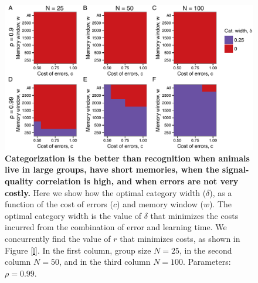 \begin{figure}
\includegraphics[width=6.85in]{figures/strategies_heat_maps.pdf}
\caption{\sffamily\small\textbf{Categorization is the better than recognition when animals live in large groups, have short memories, when the signal-quality correlation is high, and when errors are not very costly.} Here we show how the optimal category width ($\delta$), as a function of the cost of errors ($c$) and memory window ($w$). The optimal category width is the value of $\delta$ that minimizes the costs incurred from the combination of error and learning time. We concurrently find the value of $r$ that minimizes costs, as shown in Figure \ref{l}. In the first column, group size $N=25$, in the second column $N=50$, and in the third column $N=100$. Parameters: $\rho=0.99$. }
\label{opt_delta}
\end{figure}


